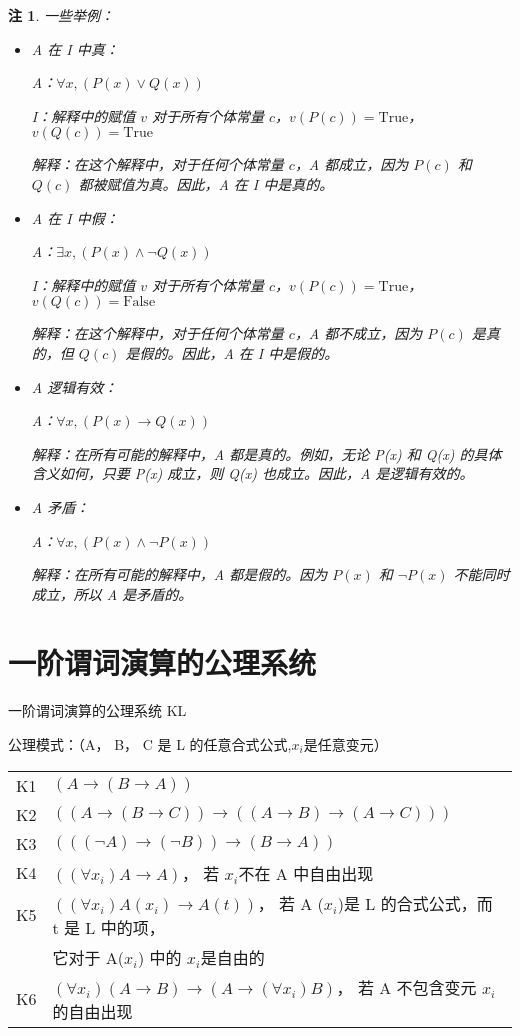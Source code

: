 \documentclass[12pt,onecolumn,a4paper]{book}
\newtheorem*{note}{注}
\numberwithin{table}{subsection}
\numberwithin{equation}{subsection}
\begin{document}
\begin{note}
    一些举例：
    \begin{itemize}[itemsep=0pt,parsep=0pt]
        \item A 在 I 中真：

    A：$\forall x , (P(x) \lor Q(x))$

    I：解释中的赋值 $v$ 对于所有个体常量 $c$，$v(P(c)) = \text{True}$，$v(Q(c)) = \text{True}$

    解释：在这个解释中，对于任何个体常量 $c$，A 都成立，因为 $P(c)$ 和 $Q(c)$ 都被赋值为真。因此，A 在 I 中是真的。
    \item A 在 I 中假：

    A：$\exists x , (P(x) \land \lnot Q(x))$

    I：解释中的赋值 $v$ 对于所有个体常量 $c$，$v(P(c)) = \text{True}$，$v(Q(c)) = \text{False}$

    解释：在这个解释中，对于任何个体常量 $c$，A 都不成立，因为 $P(c)$ 是真的，但 $Q(c)$ 是假的。因此，A 在 I 中是假的。
    \item A 逻辑有效：

    A：$\forall x , (P(x) \rightarrow Q(x))$

    解释：在所有可能的解释中，A 都是真的。例如，无论 P(x) 和 Q(x) 的具体含义如何，只要 P(x) 成立，则 Q(x) 也成立。因此，A 是逻辑有效的。
    \item A 矛盾：

    A：$\forall x , (P(x) \land \lnot P(x))$

    解释：在所有可能的解释中，A 都是假的。因为 $P(x)$ 和 $\lnot P(x)$ 不能同时成立，所以 A 是矛盾的。
\end{itemize}
\end{note}


\section{一阶谓词演算的公理系统}

一阶谓词演算的公理系统 KL

公理模式：（A， B， C 是 L 的任意合式公式,$x_i$是任意变元）

\begin{tabular}{ll}
    K1&$(A→(B→A))$\\
    K2&$((A→(B→C))→((A→B)→(A→C)))$\\
    K3&$(((¬A)→(¬B))→(B→A))$\\
    K4&$((\forall x_i)A→A)$， 若 $x_i$不在 A 中自由出现\\
    K5&$((\forall x_i)A(x_i)→ A(t))$， 若 A ($x_i$)是 L 的合式公式，而 t 是 L 中的项，\\&它对于 A($x_i$) 中的 $x_i$是自由的\\
    K6&$(\forall x_i)(A→B) →(A→(\forall x_i)B)$， 若 A 不包含变元 $x_i$的自由出现\\
\end{tabular}
\end{document}
